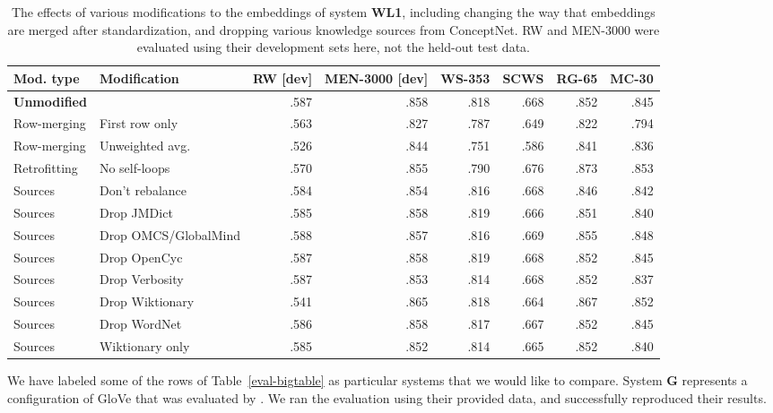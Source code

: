\documentclass[letterpaper]{article}
\begin{document}
\begin{table*}[t]
\centering
\begin{tabular}{llrrrrrr}
\toprule
Mod. type       & Modification & RW [dev] & MEN-3000 [dev] & WS-353 & SCWS &  RG-65 &  MC-30 \\
\midrule
{\bf Unmodified}&                     & .587 &      .858 &    .818 &  .668 &   .852 &   .845 \\
\midrule
Row-merging     & First row only      & .563 &      .827 &    .787 &  .649 &   .822 &   .794 \\
Row-merging     & Unweighted avg.     & .526 &      .844 &    .751 &  .586 &   .841 &   .836 \\
\midrule
Retrofitting    & No self-loops       & .570 &      .855 &    .790 &  .676 &   .873 &   .853 \\
\midrule
Sources         & Don't rebalance     & .584 &      .854 &    .816 &  .668 &   .846 &   .842 \\
Sources         & Drop JMDict         & .585 &      .858 &    .819 &  .666 &   .851 &   .840 \\
Sources         & Drop OMCS/GlobalMind& .588 &      .857 &    .816 &  .669 &   .855 &   .848 \\
Sources         & Drop OpenCyc        & .587 &      .858 &    .819 &  .668 &   .852 &   .845 \\
Sources         & Drop Verbosity      & .587 &      .853 &    .814 &  .668 &   .852 &   .837 \\
Sources         & Drop Wiktionary     & .541 &      .865 &    .818 &  .664 &   .867 &   .852 \\
Sources         & Drop WordNet        & .586 &      .858 &    .817 &  .667 &   .852 &   .845 \\
Sources         & Wiktionary only     & .585 &      .852 &    .814 &  .665 &   .852 &   .840 \\
\bottomrule
\end{tabular}
\caption{
    The effects of various modifications to the embeddings of system {\bf WL1},
    including changing the way that embeddings are merged after
    standardization, and dropping various knowledge sources from ConceptNet.
    RW and MEN-3000 were evaluated using their development sets here,
    not the held-out test data.
}
\label{eval-variations}
\end{table*}


We have labeled some of the rows of Table~\ref{eval-bigtable} as particular systems
that we would like to compare. System {\bf G} represents a configuration of
GloVe that was evaluated by . We ran the evaluation
using their provided data, and successfully reproduced their results.
\end{document}
